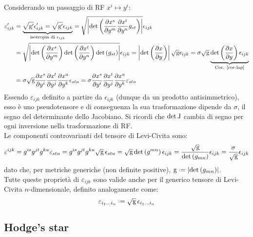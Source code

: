 Considerando un passaggio di RF $ x^i \mapsto y^i $:
\begin{equation}
	\begin{split}
		\varepsilon'_{ijk} &= \underbrace{\sqrt{\mathbf{\text{g}}'} \epsilon'_{ijk} = \sqrt{\mathbf{\text{g}}'} \epsilon_{ijk}}_{\text{isotropia di }\epsilon_{ijk}} = \sqrt{\left\lvert \det \left( \frac{\partial x^s}{\partial y^m} \frac{\partial x^t}{\partial y^n} g_{st} \right) \right\rvert} \epsilon_{ijk}\\
				   &= \sqrt{\left\lvert \det \left( \frac{\partial x^s}{\partial y^m} \right) \det \left( \frac{\partial x^t}{\partial y^n} \right) \det \left( g_{st} \right) \right\rvert} \epsilon_{ijk} = \left\lvert\det \left( \frac{\partial x}{\partial y} \right)\right\rvert \sqrt{\mathbf{\text{g}}} \epsilon_{ijk} = \sigma \sqrt{\mathbf{\text{g}}} \underbrace{\det \left( \frac{\partial x}{\partial y} \right) \epsilon_{ijk}}_{\text{Cor. \ref{cor-lap}}}\\
				   &= \sigma \sqrt{\mathbf{\text{g}}} \frac{\partial x^s}{\partial y^i} \frac{\partial x^t}{\partial y^j} \frac{\partial x^u}{\partial y^k} \epsilon_{stu} = \sigma \frac{\partial x^s}{\partial y^i} \frac{\partial x^t}{\partial y^j} \frac{\partial x^u}{\partial y^k} \varepsilon_{stu}
	\end{split}
	\label{eq:3.15}
\end{equation}
Essendo $ \varepsilon_{ijk} $ definito a partire da $ \epsilon_{ijk} $ (dunque da un prodotto antisimmetrico), esso è uno pseudotensore e di conseguenza la sua trasformazione dipende da $ \sigma $, il segno del determinante dello Jacobiano. Si ricordi che $ \det\mathbf{\text{J}} $ cambia di segno per ogni inversione nella trasformazione di RF.\\
Le componenti controvarianti del tensore di Levi-Civita sono:
\begin{equation}
	\varepsilon^{ijk} = g^{is} g^{jt} g^{ku} \varepsilon_{stu} = g^{is} g^{jt} g^{ku} \sqrt{\mathbf{\text{g}}}\, \epsilon_{stu} = \sqrt{\mathbf{\text{g}}} \det \left( g^{mn} \right) \epsilon_{ijk} = \frac{\sqrt{\mathbf{\text{g}}}}{\det \left( g_{mn} \right)} \epsilon_{ijk} = \frac{\sigma}{\sqrt{\mathbf{\text{g}}}} \epsilon_{ijk}
	\label{eq:3.16}
\end{equation}
dato che, per metriche generiche (non definite positive), $ \tens{g} \defeq \abs{\det \left( g_{mn} \right)} $.\\
Tutte queste proprietà di $ \varepsilon_{ijk} $ sono valide anche per il generico tensore di Levi-Civita $ n $-dimensionale, definito analogamente come:
\begin{equation}
	\varepsilon_{i_1 \dots i_n} \defeq \sqg \, \epsilon_{i_1 \dots i_n}
	\label{eq:3.17}
\end{equation}

\subsection{Hodge's star}

